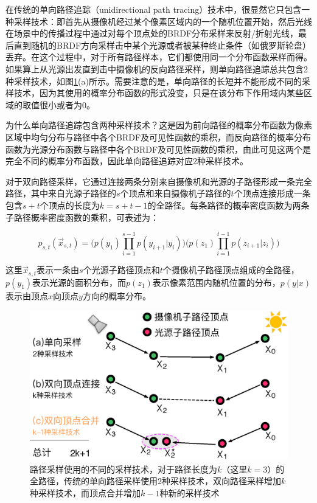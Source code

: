 在传统的单向路径追踪（unidirectional path tracing）技术中，很显然它只包含一种采样技术：即首先从摄像机经过某个像素区域内的一个随机位置开始，然后光线在场景中的传播过程中通过对每个顶点处的BRDF分布采样来反射/折射光线，最后直到随机的BRDF方向采样击中某个光源或者被某种终止条件（如俄罗斯轮盘）丢弃。在这个过程中，对于所有路径样本，它们都使用同一个分布函数采样而得。如果算上从光源出发直到击中摄像机的反向路径采样，则单向路径追踪总共包含2种采样技术，如图\ref{f:pm-sampling-techniques}(a)所示。需要注意的是，单向路径的长短并不能形成不同的采样技术，因为其使用的概率分布函数的形式没变，只是在该分布下作用域内某些区域的取值很小或者为0。

\begin{myshaded}
	为什么单向路径追踪包含两种采样技术？这是因为前向路径的概率分布函数为像素区域中均匀分布与路径中各个BRDF及可见性函数的乘积，而反向路径的概率分布函数为光源分布函数与路径中各个BRDF及可见性函数的乘积，由此可见这两个是完全不同的概率分布函数，因此单向路径追踪对应2种采样技术。
\end{myshaded}

对于双向路径采样，它通过连接两条分别来自摄像机和光源的子路径形成一条完全路径，其中来自光源子路径的$s$个顶点和来自摄像机子路径的$t$个顶点连接形成一条包含$s+t$个顶点的长度为$k=s+t-1$的全路径。每条路径的概率密度函数为两条子路径概率密度函数的乘积，可表述为：

\begin{equation}\label{e:pm-mis-pdf}
	p_{s,t}(\vec{x}_{s,t})=\Biggl(p(y_1)\prod^{s-1}_{i=1}p(y_{i+1}|y_i)\Biggl)\Biggl(p(z_1)\prod^{t-1}_{i=1}p(z_{i+1}|z_i)\Biggl)
\end{equation}

\noindent 这里$\vec{x}_{s,t}$表示一条由$s$个光源子路径顶点和$t$个摄像机子路径顶点组成的全路径，$p(y_1)$表示光源的面积分布，而$p(z_1)$表示像素范围内随机位置的分布，$p(y|x)$表示由顶点$x$向顶点$y$方向的概率分布。

\begin{figure}
	\sidecaption
	\includegraphics[width=.65\textwidth]{figures/pm/sampling-techniques}
	\caption{路径采样使用的不同的采样技术，对于路径长度为$k$（这里$k=3$）的全路径，传统的单向路径采样使用2种采样技术，双向路径采样增加$k$种采样技术，而顶点合并增加$k-1$种新的采样技术}
	\label{f:pm-sampling-techniques}
\end{figure}

